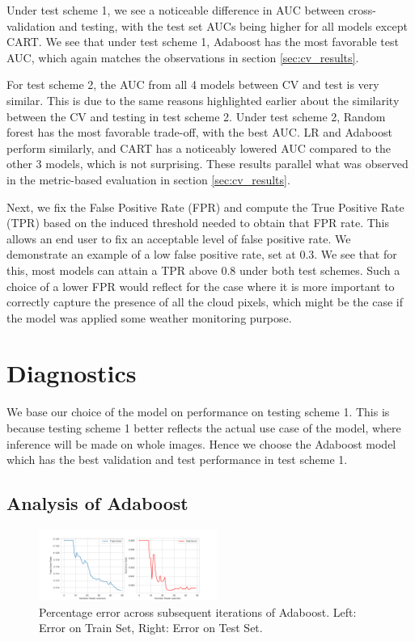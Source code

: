 \documentclass[11pt, letterpaper, journal]{IEEEtran}
\begin{document}
Under test scheme 1, we see a noticeable difference in AUC between cross-validation and testing, with the test set AUCs being higher for all models except CART. We see that under test scheme 1, Adaboost has the most favorable test AUC, which again matches the observations in section \ref{sec:cv_results}.

For test scheme 2, the AUC from all 4 models between CV and test is very similar. This is due to the same reasons highlighted earlier about the similarity between the CV and testing in test scheme 2. Under test scheme 2, Random forest has the most favorable trade-off, with the best AUC. LR and Adaboost perform similarly, and CART has a noticeably lowered AUC compared to the other 3 models, which is not surprising. These results parallel what was observed in the metric-based evaluation in section \ref{sec:cv_results}.

Next, we fix the False Positive Rate (FPR) and compute the True Positive Rate (TPR) based on the induced threshold needed to obtain that FPR rate. This allows an end user to fix an acceptable level of false positive rate. We demonstrate an example of a low false positive rate, set at 0.3. We see that for this, most models can attain a TPR above 0.8 under both test schemes. Such a choice of a lower FPR would reflect for the case where it is more important to correctly capture the presence of all the cloud pixels, which might be the case if the model was applied some weather monitoring purpose.


\section{Diagnostics}
We base our choice of the model on performance on testing scheme 1. This is because testing scheme 1 better reflects the actual use case of the model, where inference will be made on whole images. Hence we choose the Adaboost model which has the best validation and test performance in test scheme 1.

\subsection{Analysis of Adaboost}
\begin{figure}[h]
    \centering
    \includegraphics[width=0.52\textwidth]{statics/ada_iterations_tr_23_te_1.png}
    \caption{Percentage error across subsequent iterations of Adaboost. Left: Error on Train Set, Right: Error on Test Set.}
    \label{fig:Adaboost_iterations}
\end{figure}
\end{document}

